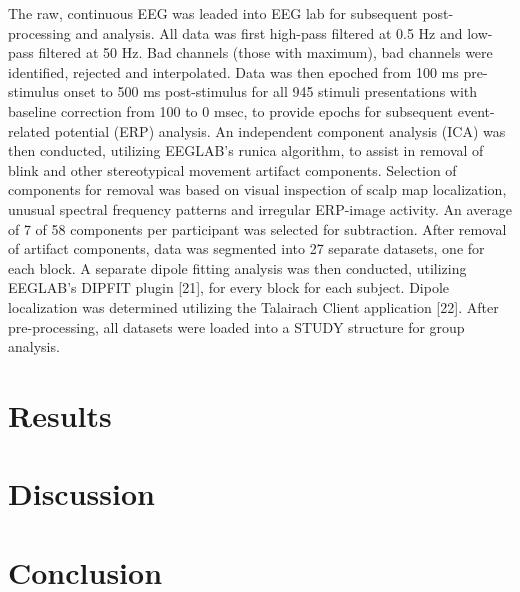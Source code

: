 The raw, continuous EEG was leaded into EEG lab \cite{delorme_eeglab:_2004} for subsequent post-processing and analysis. All data was first high-pass filtered at 0.5 Hz and low-pass filtered at 50 Hz. Bad channels (those with maximum), bad channels were identified, rejected and interpolated. Data was then epoched from 100 ms pre- stimulus onset to 500 ms post-stimulus for all 945 stimuli presentations with baseline correction from 100 to 0 msec, to provide epochs for subsequent event-related potential (ERP) analysis. An independent component analysis (ICA) was then conducted, utilizing EEGLAB’s runica algorithm, to assist in removal of blink and other stereotypical movement artifact components. Selection of components for removal was based on visual inspection of scalp map localization, unusual spectral frequency patterns and irregular ERP-image activity. An average of 7 of 58 components per participant was selected for subtraction. After removal of artifact components, data was segmented into 27 separate datasets, one for each block. A separate dipole fitting analysis was then conducted, utilizing EEGLAB’s DIPFIT plugin [21], for every block for each subject. Dipole localization was determined utilizing the Talairach Client application [22]. After pre-processing, all datasets were loaded into a STUDY structure for group analysis.








\section{Results}

\section{Discussion}

\section{Conclusion}